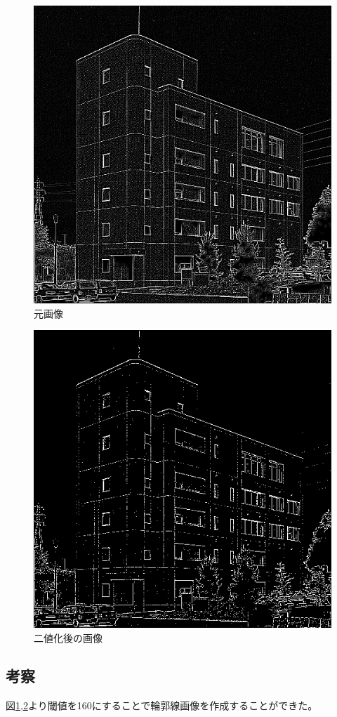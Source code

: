 \documentclass[11pt,a4paper,titlepage,dvipdfmx]{jarticle}
\begin{document}
    \begin{figure}[H]
      \centering
      \includegraphics[scale=.8]{./laplacian-building.bmp}
      \caption{元画像}
      \label{fig:building-binarize}
    \end{figure} 
    \begin{figure}[H]
      \centering
      \includegraphics[scale=.8]{./binarize-building.bmp}
      \caption{二値化後の画像}
      \label{fig:after-building-binarize}
    \end{figure} 
  
  \subsection{考察}
   図\ref{fig:building-binarize},\ref{fig:after-building-binarize}より閾値を160にすることで輪郭線画像を作成することができた。
\end{document}
